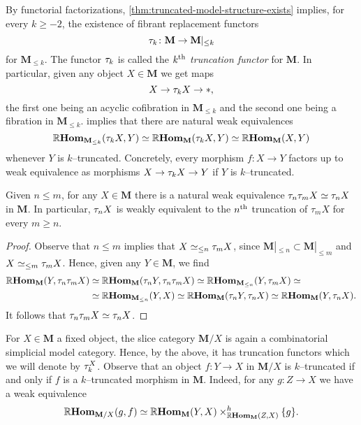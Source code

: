 By functorial factorizations, \autoref{thm:truncated-model-structure-exists} implies, for every \(k\geq -2\), the existence of fibrant replacement functors
\[\tau_{k}\colon \mathbf{M}\to\mathbf{M}|_{\leq k}\]
for \(\mathbf M_{\leq k}\). The functor \(\tau_{k}\) is called the \emph{\(k\textsuperscript{th}\) truncation functor} for \(\mathbf{M}\). In particular, given any object \(X\in\mathbf{M}\) we get maps
\[X\to \tau_{k} X\to *,\]
the first one being an acyclic cofibration in \(\mathbf{M}_{\leq k}\) and the second one being a fibration in \(\mathbf{M}_{\leq k}\).  implies that there are natural weak equivalences
\[\operatorname{\mathbb{R}\textnormal{\bfseries Hom}}_{\mathbf M_{\leq k}}(\tau_{k} X, Y)\simeq \operatorname{\mathbb{R}\textnormal{\bfseries Hom}}_{\mathbf M}(\tau_{k} X, Y) \simeq \operatorname{\mathbb{R}\textnormal{\bfseries Hom}}_{\mathbf M}(X, Y)\]
whenever \(Y\) is \(k\)--truncated. Concretely, every morphism \(f\colon X\to Y\) factors up to weak equivalence as morphisms \(X\to \tau_{k}X\to Y\) if \(Y\) is \(k\)--truncated.

\begin{corollary}
  Given \(n \leq m\), for any \(X\in\mathbf M\) there is a natural weak equivalence \(\tau_{n}\tau_{m} X \simeq \tau_{n} X\) in \(\mathbf M\). In particular, \(\tau_{n}X\) is weakly equivalent to the \(n\textsuperscript{th}\) truncation of \(\tau_{m}X\) for every \(m\geq n\).
\end{corollary}
\begin{proof}
  Observe that \(n\leq m\) implies that \(X \simeq_{\leq n}\tau_{m}X\), since \(\mathbf M|_{\leq n}\subset \mathbf M|_{\leq m}\) and \(X\simeq_{\leq m}\tau_{m}X\). Hence, given any \(Y\in\mathbf M\), we find
  \begin{align*}
    \operatorname{\mathbb{R}\textnormal{\bfseries Hom}}_{\mathbf M}(Y, \tau_{n}\tau_{m} X)&\simeq \operatorname{\mathbb{R}\textnormal{\bfseries Hom}}_{\mathbf M}(\tau_{n}Y, \tau_{n}\tau_{m}X)\simeq \operatorname{\mathbb{R}\textnormal{\bfseries Hom}}_{\mathbf M_{\leq n}}(Y, \tau_{m}X)\simeq \\
    &\simeq \operatorname{\mathbb{R}\textnormal{\bfseries Hom}}_{\mathbf M_{\leq n}}(Y, X) \simeq \operatorname{\mathbb{R}\textnormal{\bfseries Hom}}_{\mathbf M}(\tau_{n}Y, \tau_{n}X)\simeq \operatorname{\mathbb{R}\textnormal{\bfseries Hom}}_{\mathbf M}(Y, \tau_{n}X).
  \end{align*}
  It follows that \(\tau_{n}\tau_{m}X\simeq \tau_{n}X\).
\end{proof}

For \(X\in\mathbf{M}\) a fixed object, the slice category \(\mathbf M/X\) is again a combinatorial simplicial model category. Hence, by the above, it has truncation functors which we will denote by \(\tau_{k}^{X}\). Observe that an object \(f\colon Y\to X\) in \(\mathbf M/X\) is \(k\)--truncated if and only if \(f\) is a \(k\)--truncated morphism in \(\mathbf M\). Indeed, for any \(g\colon Z\to X\) we have a weak equivalence
\[\operatorname{\mathbb{R}\textnormal{\bfseries Hom}}_{\mathbf M/X}(g, f)\simeq \operatorname{\mathbb{R}\textnormal{\bfseries Hom}}_{\mathbf M}(Y, X)\times^{h}_{\operatorname{\mathbb{R}\textnormal{\bfseries Hom}}_{\mathbf M}(Z, X)} \{g\}.\]

